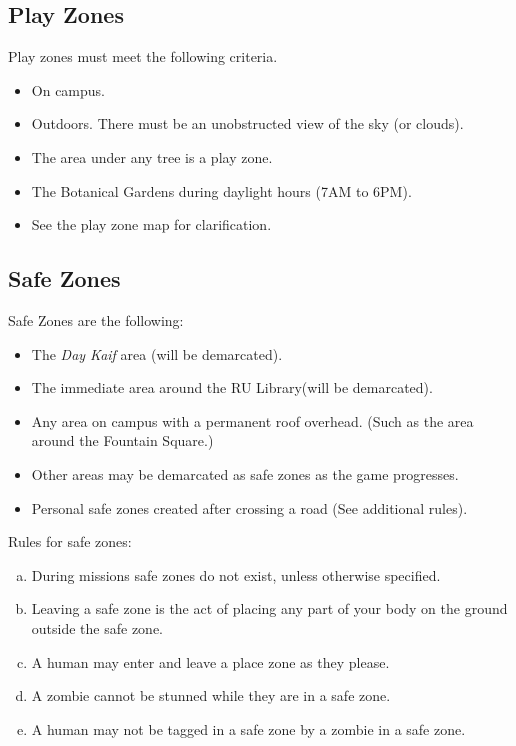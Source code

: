 \documentclass[a4paper,12pt]{article}
\begin{document}
\subsection{Play Zones}
Play zones must meet the following criteria.
\begin{itemize}
    \item On campus.
    \item Outdoors. There must be an unobstructed view of the sky (or clouds).
    \item The area under any tree is a play zone.
    \item The Botanical Gardens during daylight hours (7AM to 6PM).
    \item See the play zone map for clarification.
\end{itemize}

\subsection{Safe Zones}
Safe Zones are the following:
\begin{itemize}
    \item The \emph{Day Kaif} area (will be demarcated).
    \item The immediate area around the RU Library(will be demarcated).
    \item Any area on campus with a permanent roof overhead. (Such as the area around the Fountain Square.)
    \item Other areas may be demarcated as safe zones as the game progresses.
    \item Personal safe zones created after crossing a road (See additional rules).
\end{itemize}

Rules for safe zones:
\begin{enumerate}[(a)]
    \item During missions safe zones do not exist, unless otherwise specified.
    \item Leaving a safe zone is the act of placing any part of your body on the ground outside the safe zone.
    \item A human may enter and leave a place zone as they please.
    \item A zombie cannot be stunned while they are in a safe zone.
    \item A human may not be tagged in a safe zone by a zombie in a safe zone.
\end{enumerate}
\end{document}
